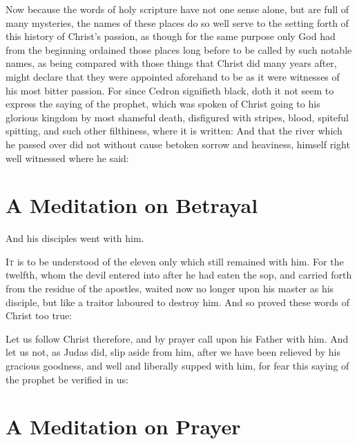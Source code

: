 \documentclass[a5paper]{scrbook}
\begin{document}
	Now because the words of holy scripture have not one sense alone, but are full of many mysteries, the names of these places do so well serve to the setting forth of this history of Christ's passion, as though for the same purpose only God had from the beginning ordained those places long before to be called by such notable names, as being compared with those things that Christ did many years after, might declare that they were appointed aforehand to be as it were witnesses of his most bitter passion. For since Cedron signifieth black, doth it not seem to express the saying of the prophet, which was spoken of Christ going to his glorious kingdom by most shameful death, disfigured with stripes, blood, spiteful spitting, and such other filthiness, where it is written:  And that the river which he passed over did not without cause betoken sorrow and heaviness, himself right well witnessed where he said: 
	
	\chapter{A Meditation on Betrayal}
	
	\begin{scripture}[Luke 22:39]
		And his disciples went with him.
	\end{scripture}
	
	\vspace{10mm}
	
	\lettrine{I}{t} is to be understood of the eleven only which still remained with him. For the twelfth, whom the devil entered into after he had eaten the sop, and carried forth from the residue of the apostles, waited now no longer upon his master as his disciple, but like a traitor laboured to destroy him. And so proved these words of Christ too true: 
	
	Let us follow Christ therefore, and by prayer call upon his Father with him. And let us not, as Judas did, slip aside from him, after we have been relieved by his gracious goodness, and well and liberally supped with him, for fear this saying of the prophet be verified in us: 
	
	\chapter{A Meditation on Prayer}
	
\end{document}
